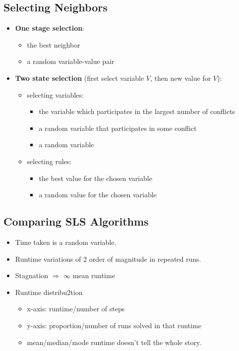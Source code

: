 \documentclass{article}
\begin{document}
\subsection{Selecting Neighbors}

\begin{itemize}
    \item \textbf{One stage selection}:
        \begin{itemize}
            \item the best neighbor
            \item a random variable-value pair
        \end{itemize}
    \item \textbf{Two state selection} (first select variable $V$, then new value for $V$):
        \begin{itemize}
            \item selecting variables:
                \begin{itemize}
                    \item the variable which participates in the largest number of conflicts
                    \item a random variable that participates in some conflict
                    \item a random variable
                \end{itemize}
            \item selecting rules:
                \begin{itemize}
                    \item the best value for the chosen variable
                    \item a random value for the chosen variable
                \end{itemize}
        \end{itemize}
\end{itemize}

\subsection{Comparing SLS Algorithms}

\begin{itemize}
    \item Time taken is a random variable.
    \item Runtime variations of 2 order of magnitude in repeated runs.
    \item Stagnation $\Rightarrow$ $\infty$ mean runtime
    \item Runtime distribu2tion
        \begin{itemize}
            \item x-axis: runtime/number of steps
            \item y-axis: proportion/number of runs solved in that runtime
            \item mean/median/mode runtime doesn't tell the whole story.
        \end{itemize}
\end{itemize}
\end{document}
